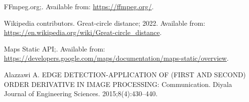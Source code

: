 \documentclass[10pt,letterpaper]{article}
\begin{document}
\begin{thebibliography}{10}
  FFmpeg.org;.
  \newblock Available from: \url{https://ffmpeg.org/}.
  
  {Wikipedia contributors}. Great-circle distance; 2022.
  \newblock Available from:
    \url{https://en.wikipedia.org/wiki/Great-circle_distance}.
  
  Maps Static API;.
  \newblock Available from:
    \url{https://developers.google.com/maps/documentation/maps-static/overview}.
  
  Alazzawi A.
  \newblock EDGE DETECTION-APPLICATION OF (FIRST AND SECOND) ORDER DERIVATIVE IN
    IMAGE PROCESSING: Communication.
  \newblock Diyala Journal of Engineering Sciences. 2015;8(4):430--440.
\end{thebibliography}
\end{document}
